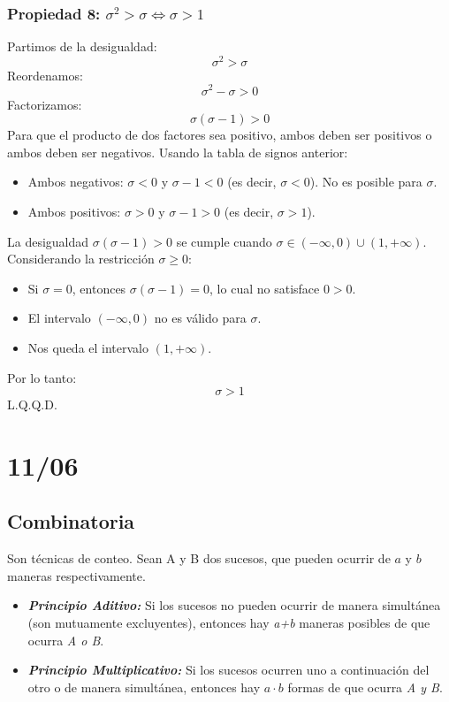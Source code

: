 \documentclass[12pt, letterpaper]{article}
\begin{document}
            \subsubsection{Propiedad 8: $\sigma^2 > \sigma \iff \sigma > 1$}
                Partimos de la desigualdad:
                \[\sigma^2 > \sigma \]
                Reordenamos:
                \[\sigma^2-\sigma > 0 \]
                Factorizamos:
                \[\sigma(\sigma-1) > 0 \]
                Para que el producto de dos factores sea positivo, ambos deben ser positivos o ambos deben ser negativos. Usando la tabla de signos anterior:
                \begin{itemize}
                    \item Ambos negativos: $\sigma < 0$ y $\sigma-1 < 0$ (es decir, $\sigma < 0$). No es posible para $\sigma$.
                    \item Ambos positivos: $\sigma > 0$ y $\sigma-1 > 0$ (es decir, $\sigma > 1$).
                \end{itemize}
                La desigualdad $\sigma(\sigma-1) > 0$ se cumple cuando $\sigma \in (-\infty, 0) \cup (1, +\infty)$.
                Considerando la restricción $\sigma \ge 0$:
                \begin{itemize}
                    \item Si $\sigma=0$, entonces $\sigma(\sigma-1)=0$, lo cual no satisface $0>0$.
                    \item El intervalo $(-\infty,0)$ no es válido para $\sigma$.
                    \item Nos queda el intervalo $(1, +\infty)$.
                \end{itemize}
                Por lo tanto:
                \[\sigma > 1\]
                L.Q.Q.D.
                \newpage


\section{11/06}
\subsection{Combinatoria} 
Son técnicas de conteo. Sean A y B dos sucesos, que pueden ocurrir de $a$ y $b$ maneras respectivamente.
\begin{itemize}
    \item \textbf{\textit{Principio Aditivo:}} Si los sucesos no pueden ocurrir de manera simultánea (son mutuamente excluyentes), entonces hay \textit{a+b} maneras posibles de que ocurra \textit{A o B}.
    \item \textbf{\textit{Principio Multiplicativo:}} Si los sucesos ocurren uno a continuación del otro o de manera simultánea, entonces hay $a \cdot b$ formas de que ocurra \textit{A y B}.
\end{itemize}
\end{document}

